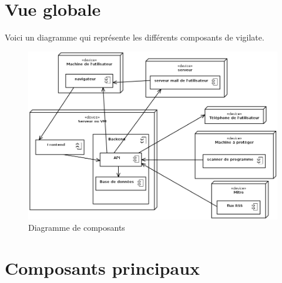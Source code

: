 \section{Vue globale}
Voici un diagramme qui représente les différents composants de vigilate.
\begin{figure}[H]
  \caption{Diagramme de composants}
  \centering
  \vspace*{0.5cm}
  \includegraphics[width=15cm]{composants.png}
\end{figure}
\section{Composants principaux}

